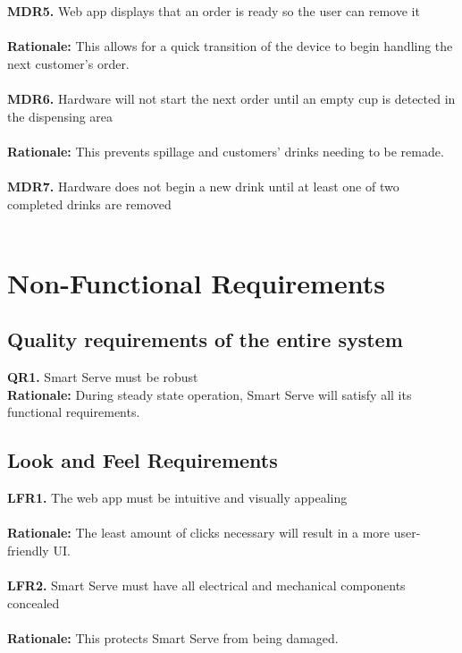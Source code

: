 \documentclass{article}
\begin{document}
    \textbf{MDR5.} Web app displays that an order is ready so the user can remove it \\\\
    \textbf{Rationale:} This allows for a quick transition of the device to begin handling the next customer's order.\\\\
    
    \textbf{MDR6.} Hardware will not start the next order until an empty cup is detected in the dispensing area\\\\
    \textbf{Rationale:} This prevents spillage and customers' drinks needing to be remade.\\\\
    
    \textbf{MDR7.} Hardware does not begin a new drink until at least one of two completed drinks are removed \\\\

\section{Non-Functional Requirements}
\subsection{Quality requirements of the entire system}
    \noindent\textbf{QR1.} Smart Serve must be robust\\ 
    
    \textbf{Rationale:} During steady state operation, Smart Serve will satisfy all its functional requirements.\\
\subsection{Look and Feel Requirements}
    \noindent\textbf{LFR1.} The web app must be intuitive and visually appealing \\\\
    \textbf{Rationale:} The least amount of clicks necessary will result in a more user-friendly UI.\\\\
    \textbf{LFR2.} Smart Serve must have all electrical and mechanical components concealed \\\\
    \textbf{Rationale:} This protects Smart Serve from being damaged.\\
\end{document}
